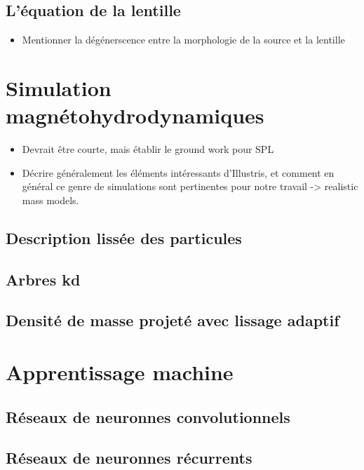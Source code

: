 \subsection{L'équation de la lentille}
\begin{itemize}
        \item Mentionner la dégénerscence entre la morphologie de la source et la 
                lentille
\end{itemize}

\section{Simulation magnétohydrodynamiques}\label{sec:simulation magnetohydrodynamique}
\begin{itemize}
        \item Devrait être courte, mais établir le ground work pour 
                SPL
        \item Décrire généralement les éléments intéressants d'Illustris, et
                comment en général ce genre de simulations sont pertinentes 
                pour notre travail -> realistic mass models.
\end{itemize}
\subsection{Description lissée des particules}

\subsection{Arbres kd}

\subsection{Densité de masse projeté avec lissage adaptif}


\section{Apprentissage machine}\label{sec:apprentissage machine}

\subsection{Réseaux de neuronnes convolutionnels}

\subsection{Réseaux de neuronnes récurrents}

